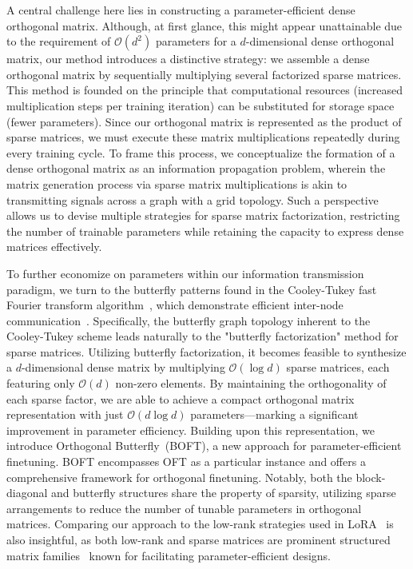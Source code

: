 A central challenge here lies in constructing a parameter-efficient dense orthogonal matrix. Although, at first glance, this might appear unattainable due to the requirement of $\mathcal{O}(d^2)$ parameters for a $d$-dimensional dense orthogonal matrix, our method introduces a distinctive strategy: we assemble a dense orthogonal matrix by sequentially multiplying several factorized sparse matrices. This method is founded on the principle that computational resources (increased multiplication steps per training iteration) can be substituted for storage space (fewer parameters). Since our orthogonal matrix is represented as the product of sparse matrices, we must execute these matrix multiplications repeatedly during every training cycle. To frame this process, we conceptualize the formation of a dense orthogonal matrix as an information propagation problem, wherein the matrix generation process via sparse matrix multiplications is akin to transmitting signals across a graph with a grid topology. Such a perspective allows us to devise multiple strategies for sparse matrix factorization, restricting the number of trainable parameters while retaining the capacity to express dense matrices effectively.

To further economize on parameters within our information transmission paradigm, we turn to the butterfly patterns found in the Cooley-Tukey fast Fourier transform algorithm~\cite{cooley1965algorithm}, which demonstrate efficient inter-node communication~\cite{klasing1994broadcasting}. Specifically, the butterfly graph topology inherent to the Cooley-Tukey scheme leads naturally to the "butterfly factorization" method for sparse matrices. Utilizing butterfly factorization, it becomes feasible to synthesize a $d$-dimensional dense matrix by multiplying $\mathcal{O}(\log d)$ sparse matrices, each featuring only $\mathcal{O}(d)$ non-zero elements. By maintaining the orthogonality of each sparse factor, we are able to achieve a compact orthogonal matrix representation with just $\mathcal{O}(d\log d)$ parameters—marking a significant improvement in parameter efficiency. Building upon this representation, we introduce Orthogonal Butterfly~(BOFT), a new approach for parameter-efficient finetuning. BOFT encompasses OFT as a particular instance and offers a comprehensive framework for orthogonal finetuning. Notably, both the block-diagonal and butterfly structures share the property of sparsity, utilizing sparse arrangements to reduce the number of tunable parameters in orthogonal matrices. Comparing our approach to the low-rank strategies used in LoRA~\cite{hulora2022} is also insightful, as both low-rank and sparse matrices are prominent structured matrix families~\cite{candes2011robust} known for facilitating parameter-efficient designs.

